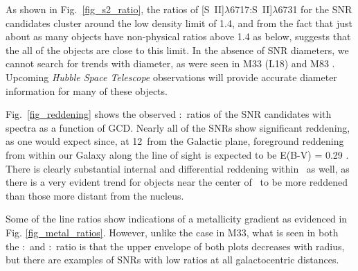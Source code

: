 

As shown in Fig.\ \ref{fig_s2_ratio}, the ratios of [S~II]$\lambda$6717:S~II]$\lambda$6731 for the SNR candidates cluster around the low density limit of 1.4, and from the fact that just about as many objects have non-physical ratios above 1.4 as below, suggests that the all of the objects are close to this limit.  In the absence of SNR diameters, we cannot search for trends with diameter, as were seen in M33 (L18) and M83 \citep{winkler17}. Upcoming {\it Hubble Space Telescope} observations will provide accurate diameter information for many of these objects.

Fig.\ \ref{fig_reddening} shows the observed \hb:\ha\ ratios of the SNR candidates with spectra as a function of GCD. Nearly all of the SNRs show significant reddening, as one would expect since, at 12\degr\ from the Galactic plane, foreground reddening from within our Galaxy along the line of sight is expected to be E(B-V) = 0.29 \citep{schlafly11}.  There is clearly substantial internal and differential reddening  within \gal\ as well, as there is a very evident trend for objects near the center of \gal\ to be more reddened than those more distant from the nucleus.


Some of the line ratios show indications of a metallicity gradient as evidenced in Fig. \ref{fig_metal_ratios}.  However, unlike the case in M33, what is seen in both the \nii:\ha\ and \sii:\ha\ ratio is that the upper envelope of both plots decreases with radius, but there are examples of SNRs with low ratios at all galactocentric distances.

